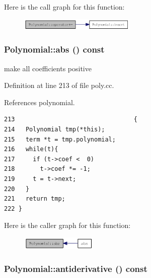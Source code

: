 Here is the call graph for this function:\nopagebreak
\begin{figure}[H]
\begin{center}
\leavevmode
\includegraphics[width=157pt]{classPolynomial_2ceb25a673d4c03b346595639ade0981_cgraph}
\end{center}
\end{figure}
\hypertarget{classPolynomial_1e8588431fc5799e62bba71368a7234d}{
\subsubsection[abs]{ Polynomial::abs () const}}
\label{classPolynomial_1e8588431fc5799e62bba71368a7234d}


make all coefficients positive 

Definition at line 213 of file poly.cc.

References polynomial.

\begin{Code}\begin{verbatim}213                                 {
214   Polynomial tmp(*this);
215   term *t = tmp.polynomial;
216   while(t){
217     if (t->coef <  0)
218       t->coef *= -1;
219     t = t->next;
220   }
221   return tmp;
222 }
\end{verbatim}
\end{Code}




Here is the caller graph for this function:\nopagebreak
\begin{figure}[H]
\begin{center}
\leavevmode
\includegraphics[width=103pt]{classPolynomial_1e8588431fc5799e62bba71368a7234d_icgraph}
\end{center}
\end{figure}
\hypertarget{classPolynomial_4db9e4f680c52fb8af45f3ae985a4055}{
\subsubsection[antiderivative]{ Polynomial::antiderivative () const}}
\label{classPolynomial_4db9e4f680c52fb8af45f3ae985a4055}


